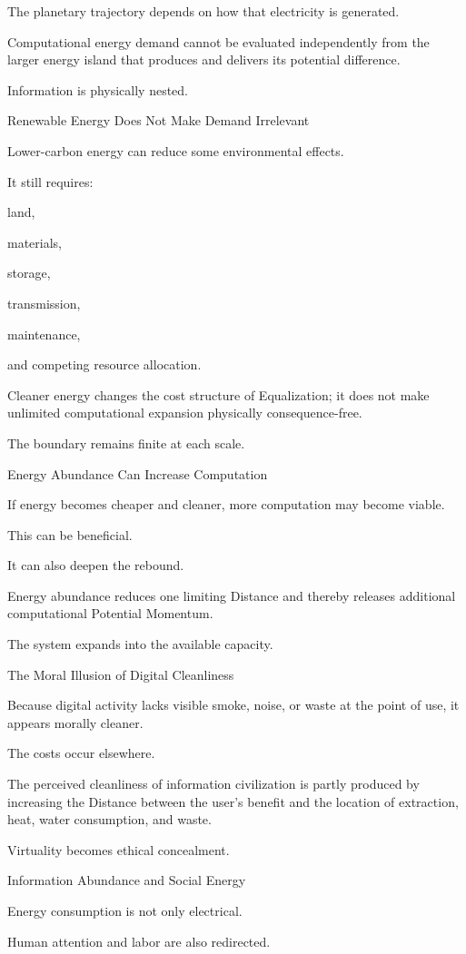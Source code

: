 The planetary trajectory depends on how that electricity is generated.

Computational energy demand cannot be evaluated independently from the larger energy island that produces and delivers its potential difference.

Information is physically nested.

Renewable Energy Does Not Make Demand Irrelevant

Lower-carbon energy can reduce some environmental effects.

It still requires:

land,

materials,

storage,

transmission,

maintenance,

and competing resource allocation.

Cleaner energy changes the cost structure of Equalization; it does not make unlimited computational expansion physically consequence-free.

The boundary remains finite at each scale.

Energy Abundance Can Increase Computation

If energy becomes cheaper and cleaner, more computation may become viable.

This can be beneficial.

It can also deepen the rebound.

Energy abundance reduces one limiting Distance and thereby releases additional computational Potential Momentum.

The system expands into the available capacity.

The Moral Illusion of Digital Cleanliness

Because digital activity lacks visible smoke, noise, or waste at the point of use, it appears morally cleaner.

The costs occur elsewhere.

The perceived cleanliness of information civilization is partly produced by increasing the Distance between the user’s benefit and the location of extraction, heat, water consumption, and waste.

Virtuality becomes ethical concealment.

Information Abundance and Social Energy

Energy consumption is not only electrical.

Human attention and labor are also redirected.

